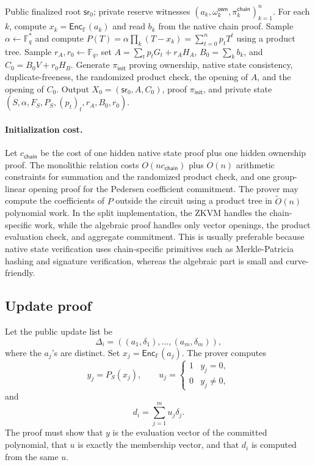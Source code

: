 \documentclass[runningheads]{llncs}
\newcommand{\F}{\mathbb{F}}
\newcommand{\Enc}{\mathsf{Enc}}
\newcommand{\sr}{\mathsf{sr}}
\newcommand{\softO}{\widetilde{O}}
\newcommand{\dlist}{\Delta}
\begin{document}
\begin{algorithm}[H]
\caption{Bulletproof/IPA algebraic initialization protocol}
\label{alg:bp-init}
\begin{algorithmic}[1]
\Require Public finalized root \(\sr_0\); private reserve witnesses \((a_k,\omega_k^{\mathsf{own}},\pi_k^{\mathsf{chain}})_{k=1}^n\).
\State For each \(k\), compute \(x_k=\Enc_\F(a_k)\) and read \(b_k\) from the native chain proof.
\State Sample \(\alpha\leftarrow\F_q^*\) and compute \(P(T)=\alpha\prod_k(T-x_k)=\sum_{t=0}^np_tT^t\) using a product tree.
\State Sample \(r_A,r_0\leftarrow\F_q\), set \(A=\sum_t p_tG_t+r_AH_A\), \(B_0=\sum_kb_k\), and \(C_0=B_0V+r_0H_B\).
\State Generate \(\pi_{\mathsf{init}}\) proving ownership, native state consistency, duplicate-freeness, the randomized product check, the opening of \(A\), and the opening of \(C_0\).
\State Output \(X_0=(\sr_0,A,C_0)\), proof \(\pi_{\mathsf{init}}\), and private state \((S,\alpha,F_S,P_S,(p_t)_t,r_A,B_0,r_0)\).
\end{algorithmic}
\end{algorithm}

\paragraph{Initialization cost.}
Let \(c_{\mathsf{chain}}\) be the cost of one hidden native state proof plus one hidden ownership proof.  The monolithic relation costs \(O(nc_{\mathsf{chain}})\) plus \(O(n)\) arithmetic constraints for summation and the randomized product check, and one group-linear opening proof for the Pedersen coefficient commitment.  The prover may compute the coefficients of \(P\) outside the circuit using a product tree in \(\softO(n)\) polynomial work.  In the split implementation, the ZKVM handles the chain-specific work, while the algebraic proof handles only vector openings, the product evaluation check, and aggregate commitment.  This is usually preferable because native state verification uses chain-specific primitives such as Merkle-Patricia hashing and signature verification, whereas the algebraic part is small and curve-friendly.

\subsection{Update proof}

Let the public update list be
\[
        \dlist_i=((a_1,\delta_1),\ldots,(a_m,\delta_m)),
\]
where the \(a_j\)'s are distinct.  Set \(x_j=\Enc_{\F}(a_j)\).  The prover computes
\[
        y_j=P_S(x_j),\qquad u_j=\begin{cases}1 & y_j=0,\\ 0 & y_j\ne 0,\end{cases}
\]
and
\[
        d_i=\sum_{j=1}^m u_j\delta_j.
\]
The proof must show that \(y\) is the evaluation vector of the committed polynomial, that \(u\) is exactly the membership vector, and that \(d_i\) is computed from the same \(u\).
\end{document}
